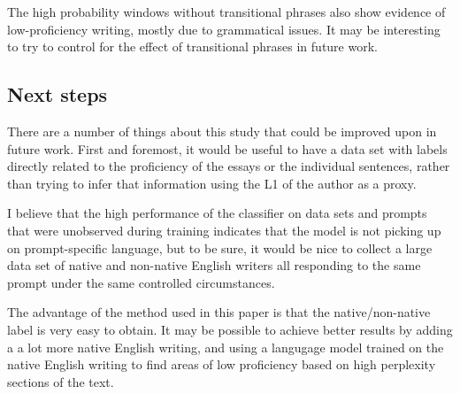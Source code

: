 \documentclass{article} %
\begin{document}
The high probability windows without transitional
phrases also show evidence of low-proficiency writing, mostly due to
grammatical issues. It may be interesting to try to control for the effect of
transitional phrases in future work.


\subsection{Next steps} \label{future}

There are a number of things about this study that could be improved upon in
future work. First and foremost, it would be useful to have a data set with
labels directly related to the proficiency of the essays or the individual sentences,
rather than trying to infer that information using the L1 of the author as a proxy.

I believe that the high performance of the classifier on data sets and prompts
that were unobserved during training indicates that the model is not picking up
on prompt-specific language, but to be sure, it would be nice to collect a large
data set of native and non-native English writers all responding to the same
prompt under the same controlled circumstances.

The advantage of the method used in this paper is that the native/non-native label
is very easy to obtain. It may be possible to achieve better results by adding a
a lot more native English writing, and using a langugage model trained on the
native English writing to find areas of low proficiency based on high perplexity
sections of the text.
\end{document}
